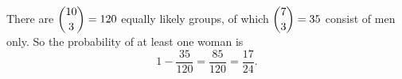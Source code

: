 There are $\dbinom{10}{3}=120$ equally likely groups, of which $\dbinom73=35$ consist of men only. So the probability of at least one woman is
\[1-\dfrac{35}{120}=\dfrac{85}{120}=\boxed{\dfrac{17}{24}}.\]
